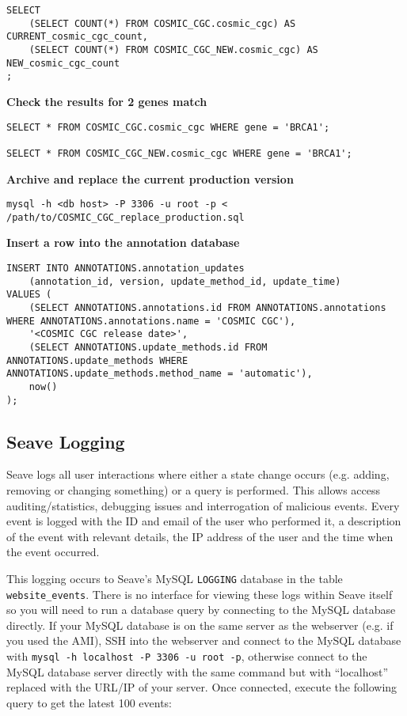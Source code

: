 \documentclass[11pt, a4paper]{article}
\begin{document}
\begin{lstlisting}
SELECT 
	(SELECT COUNT(*) FROM COSMIC_CGC.cosmic_cgc) AS CURRENT_cosmic_cgc_count,
	(SELECT COUNT(*) FROM COSMIC_CGC_NEW.cosmic_cgc) AS NEW_cosmic_cgc_count
;
\end{lstlisting}

\textbf{Check the results for 2 genes match}

\begin{lstlisting}
SELECT * FROM COSMIC_CGC.cosmic_cgc WHERE gene = 'BRCA1';

SELECT * FROM COSMIC_CGC_NEW.cosmic_cgc WHERE gene = 'BRCA1';
\end{lstlisting}

\textbf{Archive and replace the current production version}

\texttt{mysql -h <db host> -P 3306 -u root -p < /path/to/COSMIC\_CGC\_replace\_production.sql}

\textbf{Insert a row into the annotation database}

\begin{lstlisting}
INSERT INTO ANNOTATIONS.annotation_updates 
	(annotation_id, version, update_method_id, update_time)
VALUES (
	(SELECT ANNOTATIONS.annotations.id FROM ANNOTATIONS.annotations WHERE ANNOTATIONS.annotations.name = 'COSMIC CGC'),
	'<COSMIC CGC release date>',
	(SELECT ANNOTATIONS.update_methods.id FROM ANNOTATIONS.update_methods WHERE ANNOTATIONS.update_methods.method_name = 'automatic'),
	now()
);
\end{lstlisting}


\subsection{Seave Logging}

Seave logs all user interactions where either a state change occurs (e.g. adding, removing or changing something) or a query is performed. This allows access auditing/statistics, debugging issues and interrogation of malicious events. Every event is logged with the ID and email of the user who performed it, a description of the event with relevant details, the IP address of the user and the time when the event occurred. 

This logging occurs to Seave's MySQL \texttt{LOGGING} database in the table \texttt{website\_events}. There is no interface for viewing these logs within Seave itself so you will need to run a database query by connecting to the MySQL database directly. If your MySQL database is on the same server as the webserver (e.g. if you used the AMI), SSH into the webserver and connect to the MySQL database with \texttt{mysql -h localhost -P 3306 -u root -p}, otherwise connect to the MySQL database server directly with the same command but with ``localhost'' replaced with the URL/IP of your server. Once connected, execute the following query to get the latest 100 events:
\end{document}
